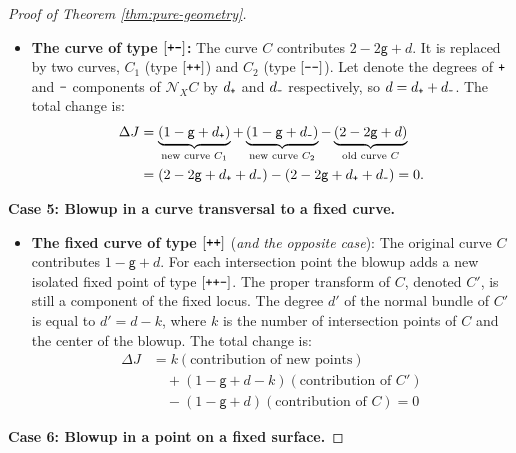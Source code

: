 \documentclass[12pt,a4paper]{amsart}
\theoremstyle{definition}
\theoremstyle{remark}
\newcommand{\lp}{\textup{\texttt{+}}}
\newcommand{\lm}{\textup{\texttt{-}}}
\begin{document}
\begin{proof}[Proof of Theorem \ref{thm:pure-geometry}]
\begin{itemize}
    \item \textbf{The curve of type $[\lp\lm]$:} The curve $C$ contributes $2 - 2\mathsf{g} + d$. It is replaced by two curves, $C_1$ (type $[\lp\lp]$) and $C_2$ (type $[\lm\lm]$). Let denote the degrees of $\lp$ and $\lm$ components of $\mathcal N_XC$ by $d_\lp$ and $d_\lm$ respectively, so $d = d_\lp + d_\lm$. The total change is:
    \begin{align}
        \Delta J &= \underbrace{(1 - \mathsf{g} + d_\lp)}_{\text{new curve } C_1} + \underbrace{(1 - \mathsf{g} + d_\lm)}_{\text{new curve } C_2} - \underbrace{(2 - 2\mathsf{g} + d)}_{\text{old curve } C} \\
        &= (2 - 2\mathsf{g} + d_\lp + d_\lm) - (2 - 2\mathsf{g} + d_\lp + d_\lm) = 0.
    \end{align}
\end{itemize}

\noindent \textbf{Case 5: Blowup in a curve transversal to a fixed curve.}
\begin{itemize}
    \item \textbf{The fixed curve of type $[\lp\lp]$} (\textit{and the opposite case}):  The original curve $C$ contributes $1-\mathsf{g}+d$. For each intersection point the blowup adds a new isolated fixed point of type $[\lp\lp\lm]$. The proper transform of $C$, denoted $C'$, is still a component of the fixed locus. The degree $d'$ of the normal bundle of $C'$ is equal to $d'=d-k$, where $k$ is the number of intersection points of $C$ and the center of the blowup. The total change is:
 \begin{align}
    \Delta J &= k (\text{contribution of new points}) \\
             &\quad + (1 - \mathsf g + d - k) (\text{contribution of } C') \\
             &\quad - (1 - \mathsf g + d) (\text{contribution of } C) = 0
\end{align}
\end{itemize}

\noindent \textbf{Case 6: Blowup in a point on a fixed surface.}


\end{proof}
\end{document}
